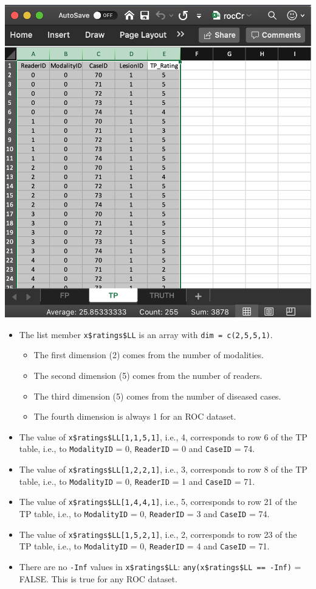 \documentclass[
]{book}
\providecommand{\tightlist}{%
  \setlength{\itemsep}{0pt}\setlength{\parskip}{0pt}}
\begin{document}
\includegraphics[width=1\textwidth,height=\textheight]{images/quick-start/rocCrTp.png}

\begin{itemize}
\tightlist
\item
  The list member \texttt{x\$ratings\$LL} is an array with \texttt{dim\ =\ c(2,5,5,1)}.

  \begin{itemize}
  \tightlist
  \item
    The first dimension (2) comes from the number of modalities.
  \item
    The second dimension (5) comes from the number of readers.
  \item
    The third dimension (5) comes from the number of diseased cases.
  \item
    The fourth dimension is always 1 for an ROC dataset.
  \end{itemize}
\item
  The value of \texttt{x\$ratings\$LL{[}1,1,5,1{]}}, i.e., 4, corresponds to row 6 of the TP table, i.e., to \texttt{ModalityID} = 0, \texttt{ReaderID} = 0 and \texttt{CaseID} = 74.
\item
  The value of \texttt{x\$ratings\$LL{[}1,2,2,1{]}}, i.e., 3, corresponds to row 8 of the TP table, i.e., to \texttt{ModalityID} = 0, \texttt{ReaderID} = 1 and \texttt{CaseID} = 71.
\item
  The value of \texttt{x\$ratings\$LL{[}1,4,4,1{]}}, i.e., 5, corresponds to row 21 of the TP table, i.e., to \texttt{ModalityID} = 0, \texttt{ReaderID} = 3 and \texttt{CaseID} = 74.
\item
  The value of \texttt{x\$ratings\$LL{[}1,5,2,1{]}}, i.e., 2, corresponds to row 23 of the TP table, i.e., to \texttt{ModalityID} = 0, \texttt{ReaderID} = 4 and \texttt{CaseID} = 71.
\item
  There are no \texttt{-Inf} values in \texttt{x\$ratings\$LL}: \texttt{any(x\$ratings\$LL\ ==\ -Inf)} = FALSE. This is true for any ROC dataset.
\end{itemize}
\end{document}
